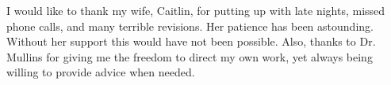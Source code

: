 \par I would like to thank my wife, Caitlin, for putting up with late nights, missed phone calls, and many terrible revisions. Her patience has been astounding. Without her support this would have not been possible. Also, thanks to Dr. Mullins for giving me the freedom to direct my own work, yet always being willing to provide advice when needed.


